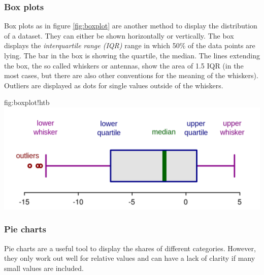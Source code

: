 	\subsubsection{Box plots}
		Box plots as in figure \ref{fig:boxplot} are another method to display the distribution of a dataset. They can either be shown horizontally or vertically. The box displays the \emph{interquartile range (IQR)} range in which 50\% of the data points are lying. The bar in the box is showing the  quartile, the median. The lines extending the box, the so called whiskers or antennas, show the area of 1.5 IQR (in the most cases, but there are also other conventions for the meaning of the whiskers). Outliers are displayed as dots for single values outside of the whiskers.			
		\begin{fig}{fig:boxplot}{!htb}
			\includegraphics[width=\textwidth,trim={0.5cm .5cm 0.5cm 6cm},clip]{P03box.png}
		\end{fig}
	\subsubsection{Pie charts}
		Pie charts are a useful tool to display the shares of different categories. However, they only work out well for relative values and can have a lack of clarity if many small values are included.		
